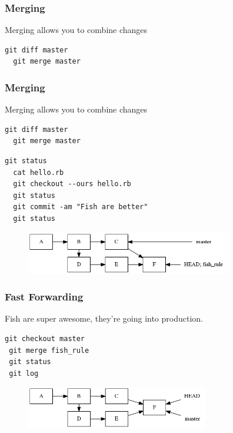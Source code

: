\documentclass{beamer}
\begin{document}
\begin{frame}[fragile]
\frametitle{Merging}

Merging allows you to combine changes

\vspace{1em}

\begin{lstlisting}[frame=single]
  git diff master
  git merge master
\end{lstlisting}

\end{frame}

\begin{frame}[fragile]
\frametitle{Merging}

Merging allows you to combine changes

\vspace{1em}

\begin{lstlisting}[frame=single]
  git diff master
  git merge master
\end{lstlisting}

\vspace{1em}

\begin{lstlisting}[frame=single]
  git status
  cat hello.rb
  git checkout --ours hello.rb 
  git status
  git commit -am "Fish are better"
  git status
\end{lstlisting}

\begin{figure}[p]
  \centering
  \includegraphics[height=5em]{merge.png}
\end{figure}

\end{frame}

\begin{frame}[fragile]
\frametitle{Fast Forwarding}

Fish are super awesome, they're going into production.

\vspace{1em}

\begin{lstlisting}[frame=single]
 git checkout master
 git merge fish_rule
 git status
 git log
\end{lstlisting}

\begin{figure}[p]
  \centering
  \includegraphics[height=5em]{fast_forward.png}
\end{figure}

\end{frame}
\end{document}
